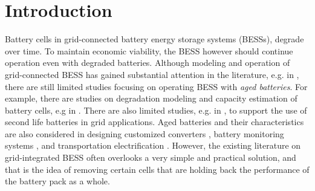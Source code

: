 \documentclass[10pt,twocolumn]{IEEEtran}
\begin{document}


\section{Introduction}

%
%
%
Battery cells  in grid-connected battery energy storage systems (BESSs), degrade  over time.
To maintain economic viability, the BESS however should continue operation even with  degraded batteries.
Although  modeling and operation  of grid-connected BESS has gained substantial attention in the literature, e.g. in \cite{8663451, 8003332}, there are still limited studies focusing on operating BESS with  \emph{aged batteries}.  
For example,  there are  studies on degradation modeling and capacity estimation of battery cells, e.g in \cite{rong2006analytical,  roscher2011detection, martinez2016evaluation, goebel2008prognostics}.
There are also limited studies, e.g. in \cite{saez2015second, keeli2012optimal},  to support the use of second life batteries in grid applications. 
%	
Aged batteries and their characteristics are also considered in designing customized converters \cite{6861989}, battery monitoring systems  \cite{tong2017demonstration}, and transportation electrification \cite{liao2017performance}.
However, the existing literature on grid-integrated BESS often overlooks a very simple and practical solution, and that is the idea of removing certain cells that are holding back the performance of the battery pack as a whole. 
\end{document}
